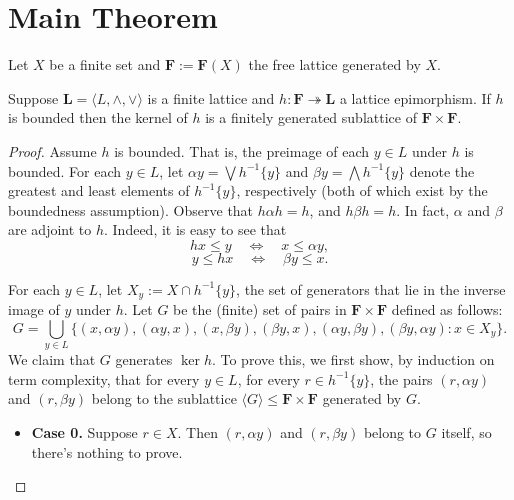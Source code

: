\section{Main Theorem}

Let $X$ be a finite set and $\mathbf F := \mathbf F(X)$ the free lattice generated by $X$.

\begin{theorem}
\label{thm:forward}
Suppose $\mathbf L = \langle L, \wedge, \vee\rangle$ is a finite lattice and 
$h\colon \mathbf{F} \twoheadrightarrow \mathbf{L}$ a lattice epimorphism.
If $h$ is bounded then the kernel of $h$ is a finitely generated sublattice 
of $\mathbf F \times \mathbf F$.
\end{theorem}

\begin{proof}
Assume $h$ is bounded.  That is, the preimage of each $y\in L$ under $h$ is bounded.  For each $y\in L$, let $\alpha y= \bigvee h^{-1}\{y\}$ and $\beta y = \bigwedge h^{-1}\{y\}$ denote the greatest and least elements of $h^{-1}\{y\}$, respectively (both of which exist by the boundedness assumption).  Observe that $h \alpha h = h$, and $h \beta h = h$. In fact, $\alpha$ and $\beta$ are adjoint to $h$. Indeed, it is easy to see that
\[
h x \leqslant y \quad \Leftrightarrow \quad x \leqslant \alpha y,
\]
\[
y \leqslant h x \quad \Leftrightarrow \quad \beta y \leqslant x.
\]

For each $y \in L$, let $X_y := X\cap h^{-1}\{y\}$, the set of generators that lie in the inverse image of $y$ under $h$.
Let $G$ be the (finite) set of pairs in $\mathbf F \times \mathbf F$ defined as follows:
\[
G = \bigcup_{y \in L}\{(x, \alpha y), (\alpha y, x), (x, \beta y), (\beta y, x), (\alpha y, \beta y), (\beta y, \alpha y) : x \in X_y\}.
\]
We claim that $G$ generates $\ker h$.  To prove this, we first show, by induction on term complexity, that for every $y \in L$, for every $r \in h^{-1}\{y\}$, the pairs $(r,\alpha y)$ and $(r,\beta y)$ belong to the sublattice $\langle G \rangle \leqslant \mathbf F \times \mathbf F$ generated by $G$.

\begin{itemize}
  \item {\bf Case 0.} Suppose $r \in X$. Then $(r,\alpha y)$ and $(r,\beta y)$ belong to $G$ itself, so there's nothing to prove.  


\end{itemize}
\end{proof}
